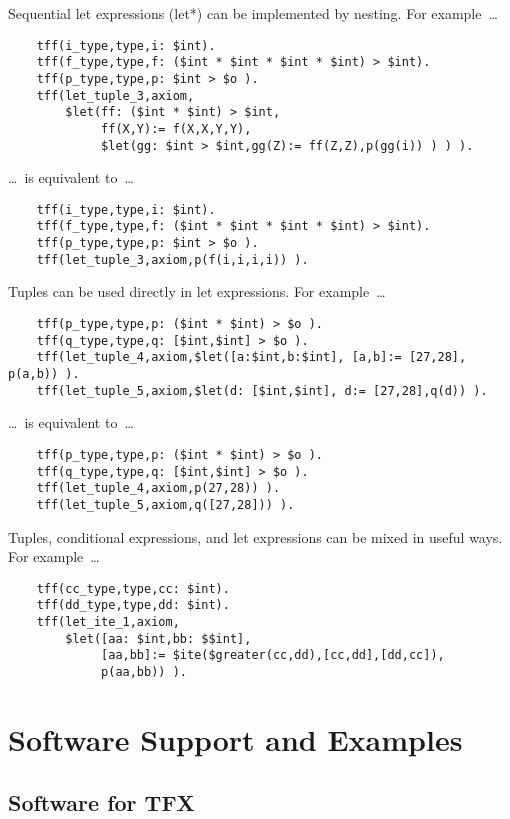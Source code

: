 \documentclass{easychair}
\begin{document}
Sequential let expressions (let*) can be implemented by nesting. 
For example~\ldots
\begin{verbatim}
    tff(i_type,type,i: $int).
    tff(f_type,type,f: ($int * $int * $int * $int) > $int).
    tff(p_type,type,p: $int > $o ).
    tff(let_tuple_3,axiom,
        $let(ff: ($int * $int) > $int,
             ff(X,Y):= f(X,X,Y,Y),
             $let(gg: $int > $int,gg(Z):= ff(Z,Z),p(gg(i)) ) ) ).
\end{verbatim}
\ldots~is equivalent to~\ldots
\begin{verbatim}
    tff(i_type,type,i: $int).
    tff(f_type,type,f: ($int * $int * $int * $int) > $int).
    tff(p_type,type,p: $int > $o ).
    tff(let_tuple_3,axiom,p(f(i,i,i,i)) ).
\end{verbatim}
Tuples can be used directly in let expressions. 
For example~\ldots
\begin{verbatim}
    tff(p_type,type,p: ($int * $int) > $o ).
    tff(q_type,type,q: [$int,$int] > $o ).
    tff(let_tuple_4,axiom,$let([a:$int,b:$int], [a,b]:= [27,28], p(a,b)) ).
    tff(let_tuple_5,axiom,$let(d: [$int,$int], d:= [27,28],q(d)) ).
\end{verbatim}
\ldots~is equivalent to~\ldots
\begin{verbatim}
    tff(p_type,type,p: ($int * $int) > $o ).
    tff(q_type,type,q: [$int,$int] > $o ).
    tff(let_tuple_4,axiom,p(27,28)) ).
    tff(let_tuple_5,axiom,q([27,28])) ).
\end{verbatim}
Tuples, conditional expressions, and let expressions can be mixed in useful 
ways. 
For example~\ldots

\begin{verbatim}
    tff(cc_type,type,cc: $int).
    tff(dd_type,type,dd: $int).
    tff(let_ite_1,axiom,
        $let([aa: $int,bb: $$int],
             [aa,bb]:= $ite($greater(cc,dd),[cc,dd],[dd,cc]),
             p(aa,bb)) ).
\end{verbatim}

\section{Software Support and Examples}
\label{ImplementationExamples}

\subsection{Software for TFX}
\label{Software}
\end{document}
